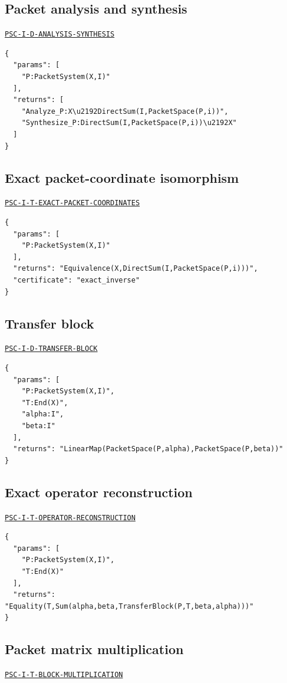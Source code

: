 \documentclass[a4paper,11pt]{article}
\begin{document}
\subsection*{Packet analysis and synthesis}
\hyperref[rec:PSC-I-D-ANALYSIS-SYNTHESIS]{\nolinkurl{PSC-I-D-ANALYSIS-SYNTHESIS}}
\begin{lstlisting}
{
  "params": [
    "P:PacketSystem(X,I)"
  ],
  "returns": [
    "Analyze_P:X\u2192DirectSum(I,PacketSpace(P,i))",
    "Synthesize_P:DirectSum(I,PacketSpace(P,i))\u2192X"
  ]
}
\end{lstlisting}
\subsection*{Exact packet-coordinate isomorphism}
\hyperref[rec:PSC-I-T-EXACT-PACKET-COORDINATES]{\nolinkurl{PSC-I-T-EXACT-PACKET-COORDINATES}}
\begin{lstlisting}
{
  "params": [
    "P:PacketSystem(X,I)"
  ],
  "returns": "Equivalence(X,DirectSum(I,PacketSpace(P,i)))",
  "certificate": "exact_inverse"
}
\end{lstlisting}
\subsection*{Transfer block}
\hyperref[rec:PSC-I-D-TRANSFER-BLOCK]{\nolinkurl{PSC-I-D-TRANSFER-BLOCK}}
\begin{lstlisting}
{
  "params": [
    "P:PacketSystem(X,I)",
    "T:End(X)",
    "alpha:I",
    "beta:I"
  ],
  "returns": "LinearMap(PacketSpace(P,alpha),PacketSpace(P,beta))"
}
\end{lstlisting}
\subsection*{Exact operator reconstruction}
\hyperref[rec:PSC-I-T-OPERATOR-RECONSTRUCTION]{\nolinkurl{PSC-I-T-OPERATOR-RECONSTRUCTION}}
\begin{lstlisting}
{
  "params": [
    "P:PacketSystem(X,I)",
    "T:End(X)"
  ],
  "returns": "Equality(T,Sum(alpha,beta,TransferBlock(P,T,beta,alpha)))"
}
\end{lstlisting}
\subsection*{Packet matrix multiplication}
\hyperref[rec:PSC-I-T-BLOCK-MULTIPLICATION]{\nolinkurl{PSC-I-T-BLOCK-MULTIPLICATION}}
\end{document}
